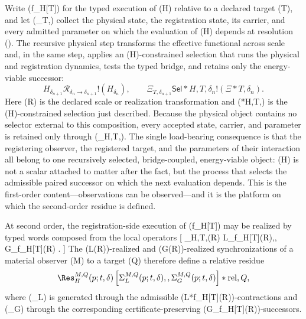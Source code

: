 \documentclass[10pt,twoside,a5paper]{article}
\theoremstyle{definition}
\begin{document}
Write (f_H[T]) for the typed execution of (H) relative to a declared target
(T), and let (\Xi_{T,\delta}) collect the physical state, the registration
state, its carrier, and every admitted parameter on which the evaluation of
(H) depends at resolution (\delta). The recursive physical step transforms the
effective functional across scale and, in the same step, applies an
(H)-constrained selection that runs the physical and registration dynamics,
tests the typed bridge, and retains only the energy-viable successor:
\begin{equation}
H_{\delta_{n+1}}

\mathcal R_{\delta_n\rightarrow\delta_{n+1}}
!\left(H_{\delta_n}\right),
\qquad
\Xi_{T,\delta_{n+1}}

\mathsf{Sel}*{H,T,\delta_n}
!\left(\Xi*{T,\delta_n}\right).
\label{eq:H-recursive-selection}
\end{equation}
Here (\mathcal R) is the declared scale or realization transformation and
(*{H,T,\delta}) is the (H)-constrained selection just described.
Because the physical object contains no selector external to this composition,
every accepted state, carrier, and parameter is retained only through
(_{H,T,\delta}). The single load-bearing consequence is that the
registering observer, the registered target, and the parameters of their
interaction all belong to one recursively selected, bridge-coupled,
energy-viable object: (H) is not a scalar attached to matter after the fact,
but the process that selects the admissible paired successor on which the next
evaluation depends. This is the first-order content---observations can be
observed---and it is the platform on which the second-order residue is defined.

At second order, the registration-side execution of (f_H[T]) may be realized
by typed words composed from the local operators
[
\omega_{H,T,\delta}(R)
\in
\left\langle
L_{f_H[T]}(R),,
G_{f_H[T]}(R)
\right\rangle .
]
The (L(R))-realized and (G(R))-realized synchronizations of a material
observer (M) to a target (Q) therefore define a relative residue
\begin{equation}
\Res_{H}^{M,Q}(p;t,\delta)

\left[
\Sigma_{L}^{M,Q}(p;t,\delta),,
\Sigma_{G}^{M,Q}(p;t,\delta)
\right]*{\mathrm{rel},Q},
\label{eq:H-observability-residue}
\end{equation}
where (\Sigma_L) is generated through the admissible
(L*{f_H[T]}(R))-contractions and (\Sigma_G) through the corresponding
certificate-preserving (G_{f_H[T]}(R))-successors.
\end{document}
